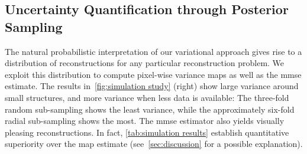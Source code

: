 \documentclass[twocolumn]{article}
\begin{document}
\begin{table}
	\caption{%
	}%
	\label{tab:diffusion comparison}
\end{table}
\subsection{Uncertainty Quantification through Posterior Sampling}
The natural probabilistic interpretation of our variational approach gives rise to a distribution of reconstructions for any particular reconstruction problem.
We exploit this distribution to compute pixel-wise variance maps as well as the \gls{mmse} estimate.
The results in~\cref{fig:simulation study} (right) show large variance around small structures, and more variance when less data is available:
The three-fold random sub-sampling shows the least variance, while the approximately six-fold radial sub-sampling shows the most.
The \gls{mmse} estimator also yields visually pleasing reconstructions.
In fact, \cref{tab:simulation results}  establish quantitative superiority over the \gls{map} estimate (see~\cref{sec:discussion} for a possible explanation).
\end{document}
